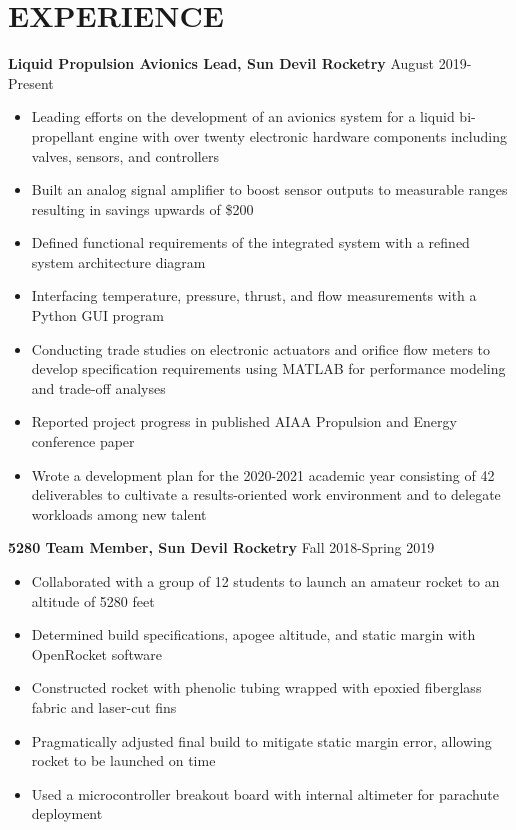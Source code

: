 \documentclass{article}
\begin{document}
\section{EXPERIENCE}
\textbf{Liquid Propulsion Avionics Lead, Sun Devil Rocketry}
\hfill
\vspace{0.5em}
August 2019-Present
\begin{itemize}
	\item{Leading efforts on the development of an avionics system for a liquid bi-propellant engine with over twenty electronic hardware components including valves, sensors, and controllers}
	\item{Built an analog signal amplifier to boost sensor outputs to measurable ranges resulting in savings upwards of \$200}
	\item{Defined functional requirements of the integrated system with a refined system architecture diagram}
	\item{Interfacing temperature, pressure, thrust, and flow measurements with a Python GUI program}
	\item{Conducting trade studies on electronic actuators and orifice flow meters to develop specification requirements using MATLAB for performance modeling and trade-off analyses}
	\item{Reported project progress in published AIAA Propulsion and Energy conference paper}
	\item{Wrote a development plan for the 2020-2021 academic year consisting of 42 deliverables to cultivate a results-oriented work environment and to delegate workloads among new talent}
\end{itemize}
\vspace{1em}
\textbf{5280 Team Member, Sun Devil Rocketry}
\hfill Fall 2018-Spring 2019
\vspace{0.5em}
\begin{itemize}
	\item Collaborated with a group of 12 students to launch an amateur rocket to an altitude of 5280 feet
	\item Determined build specifications, apogee altitude, and static margin with OpenRocket software
	\item Constructed rocket with phenolic tubing wrapped with epoxied fiberglass fabric and laser-cut fins 
	\item Pragmatically adjusted final build to mitigate static margin error, allowing rocket to be launched on time
	\item Used a microcontroller breakout board with internal altimeter for parachute deployment
\end{itemize}
\end{document}
